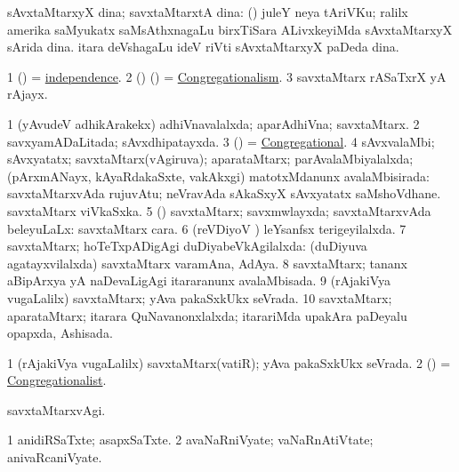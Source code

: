\bentry
{}
\gl{\nA}
\bmng
sAvxtaMtarxyX dina; savxtaMtarxtA dina: 
\banum
{} (\ame) juleY neya tAriVKu; ralilx amerika saMyukatx saMsAthxnagaLu birxTiSara ALivxkeyiMda sAvxtaMtarxyX sArida dina. 
 itara deVshagaLu ideV riVti sAvxtaMtarxyX paDeda dina. 
\eanum
\emng
\eentry

\bentry
{}
\gl{\nA}
\bmng
\bnum
\num{1} (\pArxparx)  = \hyperlink{independence}{independence}. 
\num{2} (\ca) () = \hyperref{kandict_c.pdf}{C}{Congregationalism}{Congregationalism}. 
\num{3} savxtaMtarx rASaTxrX yA rAjayx. 
\enum
\emng
\eentry

\bentry
{}
\gl{\gu}
\bmng
\bnum
\num{1} (yAvudeV adhikArakekx) adhiVnavalalxda; aparAdhiVna; savxtaMtarx. 
\num{2} savxyamADaLitada; sAvxdhipatayxda. 
\num{3} (\ca)  = \hyperref{kandict_c.pdf}{C}{Congregational}{Congregational}. 
\num{4} sAvxvalaMbi; sAvxyatatx; savxtaMtarx(vAgiruva); aparataMtarx; parAvalaMbiyalalxda; (pArxmANayx, kAyaRdakaSxte, \mo vakAkxgi) matotxMdanunx avalaMbisirada:  savxtaMtarxvAda rujuvAtu; neVravAda sAkaSxyX  sAvxyatatx saMshoVdhane.  savxtaMtarx viVkaSxka. 
\num{5} (\ga) savxtaMtarx; savxmwlayxda; savxtaMtarxvAda beleyuLaLx:  savxtaMtarx cara. 
\num{6} (reVDiyoV \vi) leYsanfsx terigeyilalxda. 
\num{7} savxtaMtarx; hoTeTxpADigAgi duDiyabeVkAgilalxda:  (duDiyuva agatayxvilalxda) savxtaMtarx varamAna, AdAya. 
\num{8} savxtaMtarx; tananx aBipArxya yA naDevaLigAgi itararanunx avalaMbisada. 
\num{9} (rAjakiVya \mo vugaLalilx) savxtaMtarx; yAva pakaSxkUkx seVrada. 
\num{10} savxtaMtarx; aparataMtarx; itarara QuNavanonxlalxda; itarariMda upakAra paDeyalu opapxda, Ashisada. 
\enum
\emng
\eentry

\bentry
{}
\gl{\nA}
\bmng
\bnum
\num{1} (rAjakiVya \mo vugaLalilx) savxtaMtarx(vatiR); yAva pakaSxkUkx seVrada. 
\num{2} (\ca)  = \hyperref{kandict_c.pdf}{C}{Congregationalist}{Congregationalist}. 
\enum
\emng
\eentry

\bentry
{}
\gl{\kirxvi}
\bmng
savxtaMtarxvAgi. 
\emng
\eentry

\bentry
{}
\gl{\nA}
\bmng
\bnum
\num{1} anidiRSaTxte; asapxSaTxte. 
\num{2} avaNaRniVyate; vaNaRnAtiVtate; anivaRcaniVyate. 
\enum
\emng
\eentry

